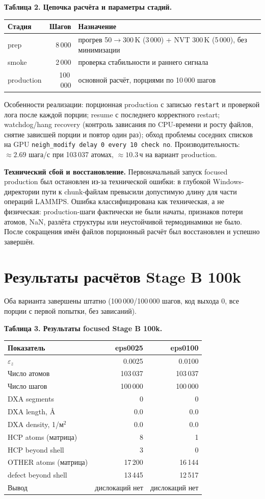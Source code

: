 \documentclass[14pt,a4paper]{extarticle}
\newcommand{\code}[1]{\texttt{#1}}
\newcommand{\tabcap}[1]{\par\smallskip\noindent\textbf{#1}\par\smallskip}
\begin{document}
\tabcap{Таблица 2. Цепочка расчёта и параметры стадий.}
\begin{longtable}{p{} r p{}}
\toprule
Стадия & Шагов & Назначение \\
\midrule
\endhead
prep & 8\,000 & прогрев 50$\to$300\,K (3\,000) + NVT 300\,K (5\,000), без минимизации \\
smoke & 2\,000 & проверка стабильности и раннего сигнала \\
production & 100\,000 & основной расчёт, порциями по 10\,000 шагов \\
\bottomrule
\end{longtable}

Особенности реализации: порционная production с записью \code{restart} и проверкой лога после каждой порции; resume с последнего корректного restart; watchdog/hang recovery (контроль зависания по CPU-времени и росту файлов, снятие зависшей порции и повтор один раз); обход проблемы соседних списков на GPU \code{neigh\_modify delay 0 every 10 check no}. Производительность: $\approx 2.69$ шага/с при 103\,037 атомах, $\approx 10.3$\,ч на вариант production.

\textbf{Технический сбой и восстановление.} Первоначальный запуск focused production был остановлен из-за технической ошибки: в глубокой Windows-директории пути к chunk-файлам превысили допустимую длину для части операций LAMMPS. Ошибка классифицирована как техническая, а не физическая: production-шаги фактически не были начаты, признаков потери атомов, NaN, разлёта структуры или неустойчивой термодинамики не было. После сокращения имён файлов порционный расчёт был восстановлен и успешно завершён.

\section{Результаты расчётов Stage B 100k}
Оба варианта завершены штатно (100\,000/100\,000 шагов, код выхода 0, все порции с первой попытки, без зависаний).

\tabcap{Таблица 3. Результаты focused Stage B 100k.}
\begin{longtable}{p{} r r}
\toprule
Показатель & eps0025 & eps0100 \\
\midrule
\endhead
$\varepsilon_z$ & 0.0025 & 0.0100 \\
Число атомов & 103\,037 & 103\,037 \\
Число шагов & 100\,000 & 100\,000 \\
DXA segments & 0 & 0 \\
DXA length, \AA & 0.0 & 0.0 \\
DXA density, 1/м$^2$ & 0.0 & 0.0 \\
HCP atoms (матрица) & 8 & 1 \\
HCP beyond shell & 3 & 0 \\
OTHER atoms (матрица) & 17\,200 & 16\,144 \\
defect beyond shell & 13\,445 & 12\,517 \\
Вывод & дислокаций нет & дислокаций нет \\
\bottomrule
\end{longtable}
\end{document}
